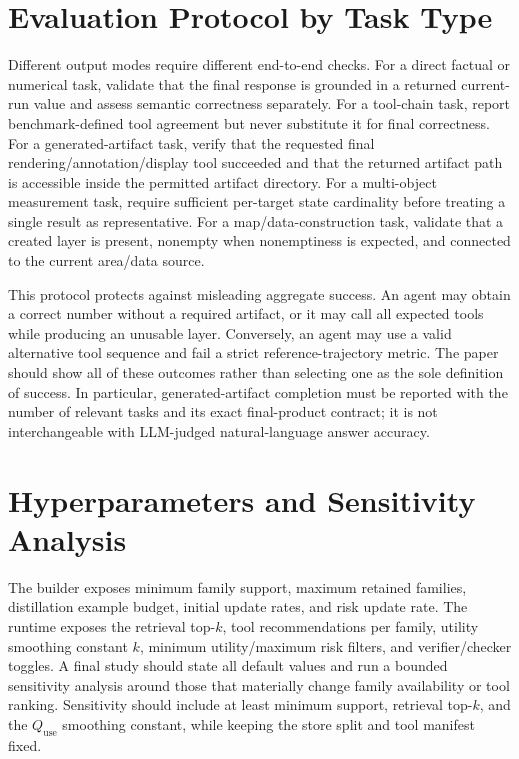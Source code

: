 \documentclass[10pt]{article}
\newcommand{\quse}{Q_{\mathrm{use}}}
\begin{document}
\section{Evaluation Protocol by Task Type}
Different output modes require different end-to-end checks. For a direct factual or numerical task, validate that the final response is grounded in a returned current-run value and assess semantic correctness separately. For a tool-chain task, report benchmark-defined tool agreement but never substitute it for final correctness. For a generated-artifact task, verify that the requested final rendering/annotation/display tool succeeded and that the returned artifact path is accessible inside the permitted artifact directory. For a multi-object measurement task, require sufficient per-target state cardinality before treating a single result as representative. For a map/data-construction task, validate that a created layer is present, nonempty when nonemptiness is expected, and connected to the current area/data source.

This protocol protects against misleading aggregate success. An agent may obtain a correct number without a required artifact, or it may call all expected tools while producing an unusable layer. Conversely, an agent may use a valid alternative tool sequence and fail a strict reference-trajectory metric. The paper should show all of these outcomes rather than selecting one as the sole definition of success. In particular, generated-artifact completion must be reported with the number of relevant tasks and its exact final-product contract; it is not interchangeable with LLM-judged natural-language answer accuracy.

\section{Hyperparameters and Sensitivity Analysis}
The builder exposes minimum family support, maximum retained families, distillation example budget, initial update rates, and risk update rate. The runtime exposes the retrieval top-$k$, tool recommendations per family, utility smoothing constant $k$, minimum utility/maximum risk filters, and verifier/checker toggles. A final study should state all default values and run a bounded sensitivity analysis around those that materially change family availability or tool ranking. Sensitivity should include at least minimum support, retrieval top-$k$, and the $\quse$ smoothing constant, while keeping the store split and tool manifest fixed.
\end{document}
